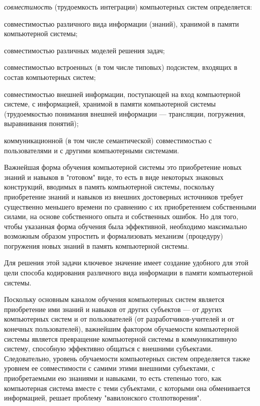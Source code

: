 \textit{совместимость} (трудоемкость интеграции) компьютерных систем определяется:
\begin{textitemize}
	\item совместимостью различного вида информации (знаний), хранимой в памяти компьютерной системы;
	\item совместимостью различных моделей решения задач;
	\item совместимостью встроенных (в том числе типовых) подсистем, входящих в состав компьютерных систем;
	\item совместимостью внешней информации, поступающей на вход компьютерной системе, с информацией, хранимой в памяти компьютерной системы (трудоемкостью понимания внешней информации --- трансляции, погружения, выравнивания понятий);
	\item коммуникационной (в том числе семантической) совместимостью с пользователями и с другими компьютерными системами.
\end{textitemize}

Важнейшая форма обучения компьютерной системы это приобретение новых знаний и навыков в "готовом"{} виде, то есть в виде некоторых знаковых конструкций, вводимых в память компьютерной системы, поскольку приобретение знаний и навыков из внешних достоверных источников требует существенно меньшего времени по сравнению с их приобретением собственными силами, на основе собственного опыта и собственных ошибок. Но для того, чтобы указанная форма обучения была эффективной, необходимо максимально возможным образом упростить и формализовать механизм (процедуру) погружения новых знаний в память компьютерной системы.

Для решения этой задачи ключевое значение имеет создание удобного для этой цели способа кодирования различного вида информации в памяти компьютерной системы.

Поскольку основным каналом обучения компьютерных систем является приобретение ими знаний и навыков от других субъектов --- от других компьютерных систем и от пользователей (от разработчиков-учителей и от конечных пользователей), важнейшим фактором обучаемости компьютерной системы является превращение компьютерной системы в коммуникативную систему, способную эффективно общаться с внешними субъектами. Следовательно, уровень обучаемости компьютерных систем определяется также уровнем ее совместимости с самими этими внешними субъектами, с приобретаемыми ею знаниями и навыками, то есть степенью того, как компьютерная система вместе с теми субъектами, с которыми она обменивается информацией, решает проблему "вавилонского столпотворения"{}.

